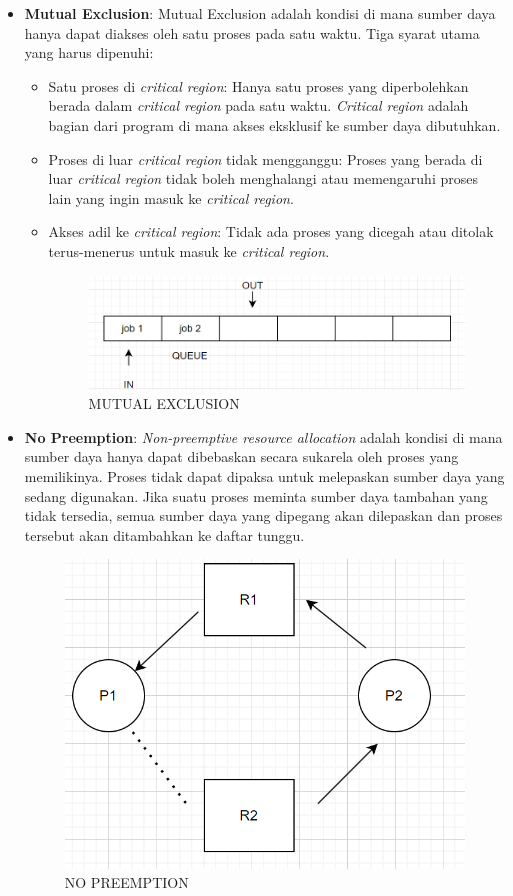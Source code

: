 \documentclass[12pt]{article}
\begin{document}
\begin{itemize}
\begin{itemize}
    \item \textbf{Mutual Exclusion}:
    Mutual Exclusion adalah kondisi di mana sumber daya hanya dapat diakses oleh satu proses pada satu waktu. Tiga syarat utama yang harus dipenuhi:
    \begin{itemize}
        \item Satu proses di \textit{critical region}: Hanya satu proses yang diperbolehkan berada dalam \textit{critical region} pada satu waktu. \textit{Critical region} adalah bagian dari program di mana akses eksklusif ke sumber daya dibutuhkan.
        \item Proses di luar \textit{critical region} tidak mengganggu: Proses yang berada di luar \textit{critical region} tidak boleh menghalangi atau memengaruhi proses lain yang ingin masuk ke \textit{critical region}.
        \item Akses adil ke \textit{critical region}: Tidak ada proses yang dicegah atau ditolak terus-menerus untuk masuk ke \textit{critical region}.
          \begin{figure}[htbp]
    \centering
    \includegraphics[width=1\linewidth]{asset/Mutual exclusion.png}
    \caption{MUTUAL EXCLUSION}
    \label{fig:enter-label}
    \end{figure}
    \end{itemize}
    
    \item \textbf{No Preemption}:
    \textit{Non-preemptive resource allocation} adalah kondisi di mana sumber daya hanya dapat dibebaskan secara sukarela oleh proses yang memilikinya. Proses tidak dapat dipaksa untuk melepaskan sumber daya yang sedang digunakan. Jika suatu proses meminta sumber daya tambahan yang tidak tersedia, semua sumber daya yang dipegang akan dilepaskan dan proses tersebut akan ditambahkan ke daftar tunggu.

    \begin{figure}
        \centering
        \includegraphics[width=0.5\linewidth]{asset/no preemption.png}
        \caption{NO PREEMPTION}
        \label{fig:enter-label}
    \end{figure}


\end{itemize}
\end{itemize}
\end{document}
